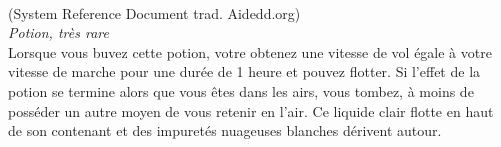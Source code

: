 \\
{\small (System Reference Document trad. Aidedd.org)}\\
{\small \it Potion, très rare}\\
Lorsque vous buvez cette potion, votre obtenez une vitesse de vol égale à votre vitesse de marche pour une durée de 1 heure et pouvez flotter. Si l'effet de la potion se termine alors que vous êtes dans les airs, vous tombez, à moins de posséder un autre moyen de vous retenir en l'air. Ce liquide clair flotte en haut de son contenant et des impuretés nuageuses blanches dérivent autour. \\

